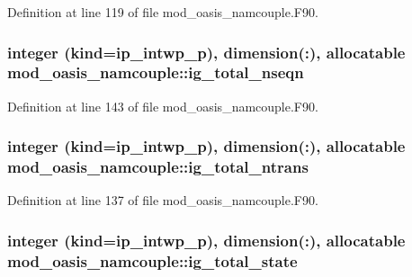 Definition at line 119 of file mod\+\_\+oasis\+\_\+namcouple.\+F90.

\hypertarget{classmod__oasis__namcouple_a09ed8be682296ef584f0d5777b2c6482}{
\subsubsection[{ig\+\_\+total\+\_\+nseqn}]{\setlength{\rightskip}{0pt plus 5cm}integer (kind=ip\+\_\+intwp\+\_\+p), dimension(\+:), allocatable mod\+\_\+oasis\+\_\+namcouple\+::ig\+\_\+total\+\_\+nseqn\hspace{0.3cm}{\ttfamily [private]}}}\label{classmod__oasis__namcouple_a09ed8be682296ef584f0d5777b2c6482}


Definition at line 143 of file mod\+\_\+oasis\+\_\+namcouple.\+F90.

\hypertarget{classmod__oasis__namcouple_abbd7bd184bb2a3860063dbb9f109f427}{
\subsubsection[{ig\+\_\+total\+\_\+ntrans}]{\setlength{\rightskip}{0pt plus 5cm}integer (kind=ip\+\_\+intwp\+\_\+p), dimension(\+:), allocatable mod\+\_\+oasis\+\_\+namcouple\+::ig\+\_\+total\+\_\+ntrans\hspace{0.3cm}{\ttfamily [private]}}}\label{classmod__oasis__namcouple_abbd7bd184bb2a3860063dbb9f109f427}


Definition at line 137 of file mod\+\_\+oasis\+\_\+namcouple.\+F90.

\hypertarget{classmod__oasis__namcouple_a7c783457d0e759e3af98b92146fa4ec3}{
\subsubsection[{ig\+\_\+total\+\_\+state}]{\setlength{\rightskip}{0pt plus 5cm}integer (kind=ip\+\_\+intwp\+\_\+p), dimension(\+:), allocatable mod\+\_\+oasis\+\_\+namcouple\+::ig\+\_\+total\+\_\+state\hspace{0.3cm}{\ttfamily [private]}}}\label{classmod__oasis__namcouple_a7c783457d0e759e3af98b92146fa4ec3}


